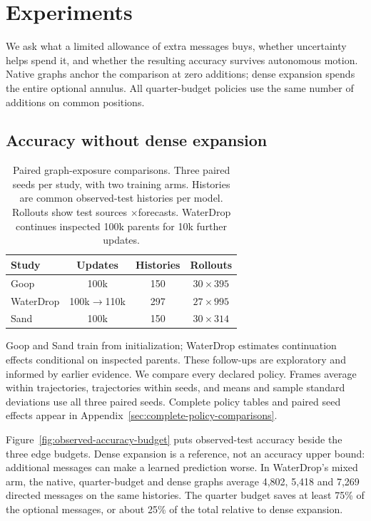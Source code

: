 \section{Experiments}
We ask what a limited allowance of extra messages buys, whether uncertainty helps spend it, and whether the resulting accuracy survives autonomous motion. Native graphs anchor the comparison at zero additions; dense expansion spends the entire optional annulus. All quarter-budget policies use the same number of additions on common positions.

\subsection{Accuracy without dense expansion}
\begin{table}[t]
\centering\small
\caption{Paired graph-exposure comparisons. Three paired seeds per study, with two training arms. Histories are common observed-test histories per model. Rollouts show test sources $\times$forecasts. WaterDrop continues inspected 100k parents for 10k further updates.}
\label{tab:study-overview}
\setlength{\tabcolsep}{3pt}
\begin{tabular}{lccc}
\toprule
Study & Updates & Histories & Rollouts\\
\midrule
Goop &100k&150&$30\times395$\\
WaterDrop &100k$\to$110k&297&$27\times995$\\
Sand &100k&150&$30\times314$\\
\bottomrule
\end{tabular}
\end{table}

Goop and Sand train from initialization; WaterDrop estimates continuation effects conditional on inspected parents. These follow-ups are exploratory and informed by earlier evidence. We compare every declared policy. Frames average within trajectories, trajectories within seeds, and means and sample standard deviations use all three paired seeds. Complete policy tables and paired seed effects appear in Appendix~\ref{sec:complete-policy-comparisons}.

Figure~\ref{fig:observed-accuracy-budget} puts observed-test accuracy beside the three edge budgets. Dense expansion is a reference, not an accuracy upper bound: additional messages can make a learned prediction worse. In WaterDrop's mixed arm, the native, quarter-budget and dense graphs average 4,802, 5,418 and 7,269 directed messages on the same histories. The quarter budget saves at least 75\% of the optional messages, or about 25\% of the total relative to dense expansion.

